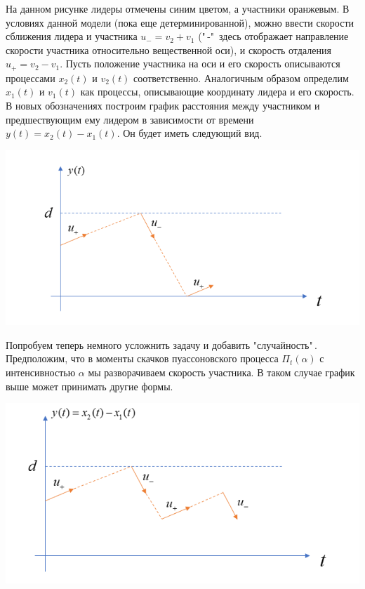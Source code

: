 \documentclass[12pt,a4paper]{article}
\begin{document}
На данном рисунке лидеры отмечены синим цветом, а участники оранжевым. В условиях данной модели (пока еще детерминированной), можно ввести скорости сближения лидера и участника $u_{-} = v_2 + v_1$ ("\,-"\, здесь отображает направление скорости участника относительно вещественной оси), и скорость отдаления \\
$u_{+} = v_2 - v_1$. Пусть положение участника на оси и его скорость описываются процессами $x_2(t)$ и $v_2(t)$ соответственно. Аналогичным образом определим $x_1(t)$ и $v_1(t)$ как процессы, описывающие координату лидера и его скорость. В новых обозначениях построим график расстояния между участником и предшествующим ему лидером в зависимости от времени $y(t) = x_2 (t) - x_1(t)$. Он будет иметь следующий вид.
\begin{center}
    \includegraphics[scale=1]{детерм.png}\\
\end{center}

Попробуем теперь немного усложнить задачу и добавить "случайность"\,. Предположим, что в моменты скачков пуассоновского процесса $ \Pi_t (\alpha)$ с интенсивностью $\alpha$ мы разворачиваем скорость участника. В таком случае график выше может принимать другие формы.
\begin{center}
    \includegraphics[scale=0.5]{стохаст.png}\\
\end{center}
\end{document}
